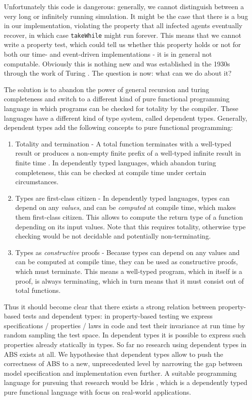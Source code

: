 Unfortunately this code is dangerous: generally, we cannot distinguish between a very long or infinitely running simulation. It might be the case that there is a bug in our implementation, violating the property that all infected agents eventually recover, in which case \texttt{takeWhile} might run forever. This means that we cannot write a property test, which could tell us whether this property holds or not for both our time- and event-driven implementations - it is in general not computable. Obviously this is nothing new and was established in the 1930s through the work of Turing \cite{turing_computable_1937}. The question is now: what can we do about it?

The solution is to abandon the power of general recursion and turing completeness and switch to a different kind of pure functional programming language in which programs can be checked for totality by the compiler. These languages have a different kind of type system, called dependent types. Generally, dependent types add the following concepts to pure functional programming:

\begin{enumerate}
	\item Totality and termination - A total function terminates with a well-typed result or produces a non-empty finite prefix of a well-typed infinite result in finite time \cite{brady_type-driven_2017}. In dependently typed languages, which abandon turing completeness, this can be checked at compile time under certain circumstances.
	
	\item Types are first-class citizen - In dependently typed languages, types can depend on any \textit{values}, and can be \textit{computed} at compile time, which makes them first-class citizen. This allows to compute the return type of a function depending on its input values. Note that this requires totality, otherwise type checking would be not decidable and potentially non-terminating.
	
	\item Types as \textit{constructive} proofs - Because types can depend on any values and can be computed at compile time, they can be used as constructive proofs, which must terminate. This means a well-typed program, which in itself is a proof, is always terminating, which in turn means that it must consist out of total functions.
\end{enumerate}

Thus it should become clear that there exists a strong relation between property-based tests and dependent types: in property-based testing we express specifications / properties / laws in code and test their invariance at run time by random sampling the test space. In dependent types it is possible to express such properties already statically in types. So far no research using dependent types in ABS exists at all. We hypothesise that dependent types allow to push the correctness of ABS to a new, unprecedented level by narrowing the gap between model specification and implementation even further. A suitable programming language for pursuing that research would be Idris \cite{brady_idris_2013}, which is a dependently typed pure functional language with focus on real-world applications.

